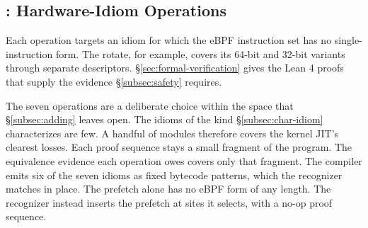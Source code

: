 

\subsection{\lang: Hardware-Idiom Operations}
\label{sec:lang}

Each \lang operation targets an idiom for which the eBPF instruction set has no single-instruction form.
The rotate, for example, covers its 64-bit and 32-bit variants through separate descriptors.
\S\ref{sec:formal-verification} gives the Lean 4 proofs that supply the evidence \S\ref{subsec:safety} requires.

The seven operations are a deliberate choice within the space that \S\ref{subsec:adding} leaves open.
The idioms of the kind \S\ref{subsec:char-idiom} characterizes are few.
A handful of modules therefore covers the kernel JIT’s clearest losses.
Each proof sequence stays a small fragment of the program.
The equivalence evidence each operation owes covers only that fragment.
The compiler emits six of the seven idioms as fixed bytecode patterns, which the recognizer matches in place.
The prefetch alone has no eBPF form of any length.
The recognizer instead inserts the prefetch at sites it selects, with a no-op proof sequence.

